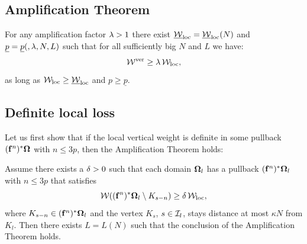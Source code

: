 \subsection{Amplification Theorem}


\begin{thm}%
\label{amplification thm}
For any amplification factor ${\lambda} > 1$ 
there exist $\underline{{\mathcal W}}_{\mathrm{loc}} = \underline{{\mathcal W}}_{\mathrm{loc}}(N) $ and  $\underline{p}=\underline{p}(, {\lambda}, N,L) $
such that for all sufficiently big $N$ and $L$ %
we have:
$$
     {\mathcal W}^{\mathrm {ver}} \geq {\lambda} \, {\mathcal W}_{\mathrm{loc}},
$$ 
as long as ${\mathcal W}_{\mathrm{loc}}\geq \underline{{\mathcal W}}_{\mathrm{loc}}$ and $p\geq \underline{p}$. 
\end{thm}

\subsection{Definite local loss}

Let us first show that if the local vertical weight is definite in  some pullback $({\mathbf{f}}^n)^* {\boldsymbol{{\Omega}}}$ with $n\leq 3p$,
then the Amplification Theorem holds:

\begin{lem}\label{def vert does it}
Assume there exists a  ${\delta} > 0$ 
such that each domain  ${\boldsymbol{{\Omega}}}_l$ has a  pullback $({\mathbf{f}}^n)^*{\boldsymbol{{\Omega}}}_l$ with $n\leq 3p$
that  satisfies
$$
      {\mathcal W} (({\mathbf{f}}^n)^*{\boldsymbol{{\Omega}}}_l\setminus K_{s-n}) \geq {\delta} \, {\mathcal W}_{\mathrm{loc}}, 
$$
where $K_{s-n}\in ({\mathbf{f}}^n)^* {\boldsymbol{{\Omega}}}_l$ and the vertex $K_s$, $s\in{\mathcal I}_l$, 
stays distance at most $\kappa N$ from $K_l$. 
Then there exists  $L=L(N)$ such that the conclusion of the Amplification Theorem holds.
\end{lem}



